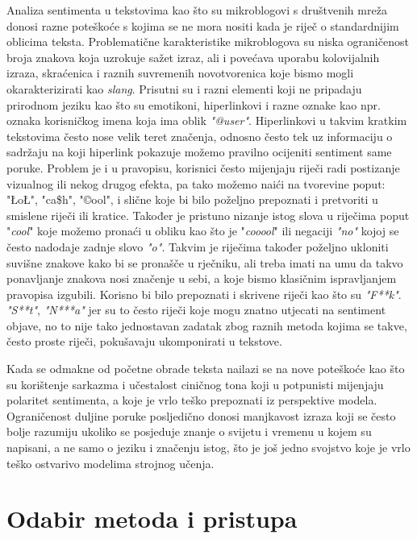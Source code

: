 \documentclass[times, utf8, zavrsni]{fer}
\begin{document}
Analiza sentimenta u tekstovima kao što su mikroblogovi s društvenih mreža donosi razne poteškoće s kojima se ne mora nositi kada je riječ o standardnijim oblicima teksta. Problematične karakteristike mikroblogova su niska ograničenost broja znakova koja uzrokuje sažet izraz, ali i povećava uporabu kolovijalnih izraza, skraćenica i raznih suvremenih novotvorenica koje bismo mogli okarakterizirati kao \emph{slang}. Prisutni su i razni elementi koji ne pripadaju prirodnom jeziku kao što su emotikoni, hiperlinkovi i razne oznake kao npr. oznaka korisničkog imena koja ima oblik \emph{"@user"}. Hiperlinkovi u takvim kratkim tekstovima često nose velik teret značenja, odnosno često tek uz informaciju o sadržaju na koji hiperlink pokazuje možemo pravilno ocijeniti sentiment same poruke. Problem je i u pravopisu, korisnici često mijenjaju riječi radi postizanje vizualnog ili nekog drugog efekta, pa tako možemo naići na tvorevine poput: "ŁoŁ", "ca\$h", "\copyright ool", i slične koje bi bilo poželjno prepoznati i pretvoriti u smislene riječi ili kratice. Također je pristuno nizanje istog slova u riječima poput "\emph{cool}" koje možemo pronaći u obliku kao što je "\emph{cooool}" ili negaciji \emph{"no"} kojoj se često nadodaje zadnje slovo \emph{"o"}. Takvim je riječima također poželjno ukloniti suvišne znakove kako bi se pronašče u rječniku, ali treba imati na umu da takvo ponavljanje znakova nosi značenje u sebi, a koje bismo klasičnim ispravljanjem pravopisa izgubili. Korisno bi bilo prepoznati i skrivene riječi kao što su \emph{"F**k"}. \emph{"S**t"}, \emph{"N***a"} jer su to često riječi koje mogu znatno utjecati na sentiment objave, no to nije tako jednostavan zadatak zbog raznih metoda kojima se takve, često proste riječi, pokušavaju ukomponirati u tekstove.

Kada se odmakne od početne obrade teksta nailazi se na nove poteškoće kao što su korištenje sarkazma i učestalost ciničnog tona koji u potpunisti mijenjaju polaritet sentimenta, a koje je vrlo teško prepoznati iz perspektive modela. Ograničenost duljine poruke posljedično donosi manjkavost izraza koji se često bolje razumiju ukoliko se posjeduje znanje o svijetu i vremenu u kojem su napisani, a ne samo o jeziku i značenju istog, što je još jedno svojstvo koje je vrlo teško ostvarivo modelima strojnog učenja. 

\section{Odabir metoda i pristupa}
\end{document}
